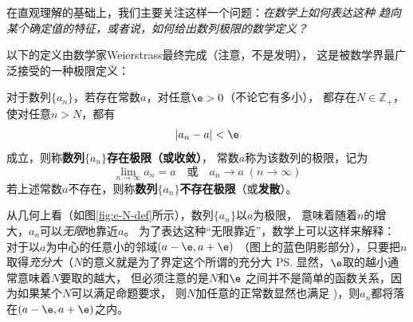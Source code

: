 在直观理解的基础上，我们主要关注这样一个问题：{\it 在数学上如何表达这种
趋向某个确定值的特征，或者说，如何给出数列极限的数学定义？}

以下的定义由数学家Weierstrass最终完成（注意，不是发明），
这是被数学界最广泛接受的一种极限定义：

\begin{thx}
	对于数列$\{a_n\}$，若存在常数$a$，对任意$\e>0$（不论它有多小），
	都存在$N\in\mathbb{Z}_+$，使对任意$n>N$，都有
	$$|a_n-a|<\e$$
	成立，则称{\bf 数列$\{a_n\}$存在极限（或收敛）}，
	常数$a$称为该数列的极限，记为
	$$\lim_{n\to\infty}a_n=a\quad
	\mbox{或}\quad
	a_n\to a\;(n\to\infty)$$
	若上述常数$a$不存在，则称{\bf 数列$\{a_n\}$不存在极限}（或{\bf 发散}）。
\end{thx}

从几何上看（如图\ref{fig:e-N-def}所示），数列$\{a_n\}$以$a$为极限，
意味着随着$n$的增大，$a_n$可以{\it 无限}地靠近$a$。
为了表达这种“无限靠近”，数学上可以这样来解释：
对于以$a$为中心的任意小的邻域$(a-\e,a+\e)$
（图上的蓝色阴影部分），只要把$n$取得{\it 充分大}（$N$的意义就是为了界定这个所谓的充分大
\ps{显然，$\e$取的越小通常意味着$N$要取的越大，
但必须注意的是$N$和$\e$
之间并不是简单的函数关系，因为如果某个$N$可以满足命题要求，
则$N$加任意的正常数显然也满足}
)，则$a_n$都将落在$(a-\e,a+\e)$之内。
	
